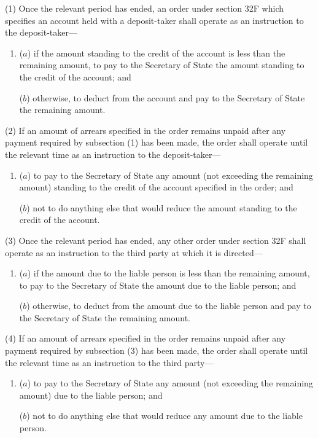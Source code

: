 \documentclass[a4paper]{article}
\begin{document}
(1) Once the relevant period has ended, an order under section 32F which specifies an account held with a deposit-taker shall operate as an instruction to the deposit-taker---
\begin{enumerate}\item[]
($a$) if the amount standing to the credit of the account is less than the remaining amount, to pay to the Secretary of State the amount standing to the credit of the account; and

($b$) otherwise, to deduct from the account and pay to the Secretary of State the remaining amount.
\end{enumerate}

(2) If an amount of arrears specified in the order remains unpaid after any payment required by subsection (1) has been made, the order shall operate until the relevant time as an instruction to the deposit-taker---
\begin{enumerate}\item[]
($a$) to pay to the Secretary of State any amount (not exceeding the remaining
amount) standing to the credit of the account specified in the order; and

($b$) not to do anything else that would reduce the amount standing to the credit
of the account.
\end{enumerate}

(3) Once the relevant period has ended, any other order under section 32F shall
operate as an instruction to the third party at which it is directed---
\begin{enumerate}\item[]
($a$) if the amount due to the liable person is less than the remaining amount, to
pay to the Secretary of State the amount due to the liable person; and

($b$) otherwise, to deduct from the amount due to the liable person and pay to the
Secretary of State the remaining amount.
\end{enumerate}

(4) If an amount of arrears specified in the order remains unpaid after any payment
required by subsection (3) has been made, the order shall operate until the relevant
time as an instruction to the third party---
\begin{enumerate}\item[]
($a$) to pay to the Secretary of State any amount (not exceeding the remaining
amount) due to the liable person; and

($b$) not to do anything else that would reduce any amount due to the liable
person.
\end{enumerate}
\end{document}
